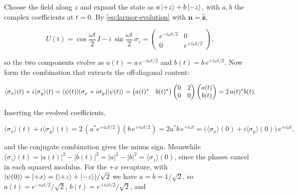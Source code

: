 Choose the field along $z$ and expand the state as $a\ket{+z} + b\ket{-z}$, with $a,b$ the complex coefficients at $t=0$. By \eqref{eq:larmor-evolution} with $\bm n = \hat{\bm z}$,
\begin{linenomath}
    \begin{equation*}
        U(t) = \cos\frac{\omega t}{2}\,I - i\,\sin\frac{\omega t}{2}\,\sigma_z
        = \begin{pmatrix}
            e^{-i\omega t/2} & 0 \\[2pt] 0 & e^{+i\omega t/2}
        \end{pmatrix},
    \end{equation*}
\end{linenomath}
so the two components evolve as $a(t) = a\,e^{-i\omega t/2}$ and $b(t) = b\,e^{+i\omega t/2}$. Now form the combination that extracts the off-diagonal content:
\begin{linenomath}
    \begin{equation*}
        \langle\sigma_x\rangle(t) + i\langle\sigma_y\rangle(t)
        = \braket{\psi(t)|(\sigma_x + i\sigma_y)|\psi(t)}
        = \begin{pmatrix} a(t)^{*} & b(t)^{*} \end{pmatrix}
          \begin{pmatrix} 0 & 2 \\ 0 & 0 \end{pmatrix}
          \begin{pmatrix} a(t) \\ b(t) \end{pmatrix}
        = 2\,a(t)^{*}b(t) .
    \end{equation*}
\end{linenomath}
Inserting the evolved coefficients,
\begin{linenomath}
    \begin{equation*}
        \langle\sigma_x\rangle(t) + i\langle\sigma_y\rangle(t)
        = 2\,(a^{*}e^{+i\omega t/2})(b\,e^{+i\omega t/2})
        = 2a^{*}b\,e^{+i\omega t}
        = \bigl(\langle\sigma_x\rangle(0) + i\langle\sigma_y\rangle(0)\bigr)\,e^{+i\omega t},
    \end{equation*}
\end{linenomath}
and the conjugate combination gives the minus sign. Meanwhile $\langle\sigma_z\rangle(t) = |a(t)|^{2} - |b(t)|^{2} = |a|^{2} - |b|^{2} = \langle\sigma_z\rangle(0)$, since the phases cancel in each squared modulus. For the $+x$ recapture, with $\ket{\psi(0)} = \ket{+x} = (\ket{+z}+\ket{-z})/\sqrt{2}$ we have $a=b=1/\sqrt{2}$, so $a(t) = e^{-i\omega t/2}/\sqrt{2}$, $b(t) = e^{+i\omega t/2}/\sqrt{2}$, and

